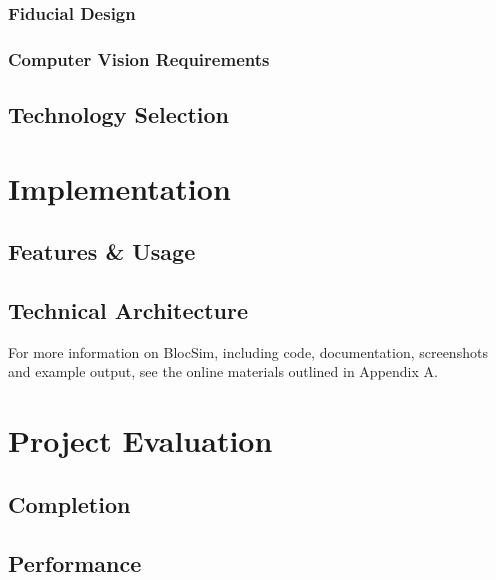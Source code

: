 \subsection{Fiducial Design}



\subsection{Computer Vision Requirements}



\section{Technology Selection}




\chapter{Implementation}



\section{Features \& Usage}



\section{Technical Architecture}


For more information on BlocSim, including code, documentation, screenshots and example output, see the online materials outlined in Appendix A.%


\chapter{Project Evaluation}



\section{Completion}



\section{Performance}



